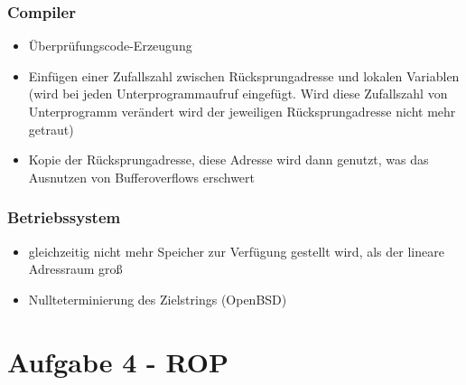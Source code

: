 \documentclass{scrartcl}
\begin{document}
\subsubsection*{Compiler}
  \begin{itemize}
    \item Überprüfungscode-Erzeugung
    \item Einfügen einer Zufallszahl zwischen Rücksprungadresse und lokalen
      Variablen (wird bei jeden Unterprogrammaufruf eingefügt. Wird diese
      Zufallszahl von Unterprogramm verändert wird der jeweiligen
      Rücksprungadresse nicht mehr getraut)
    \item Kopie der Rücksprungadresse, diese Adresse wird dann genutzt, was das
      Ausnutzen von Bufferoverflows erschwert
  \end{itemize}
\subsubsection*{Betriebssystem}
  \begin{itemize}
    \item  gleichzeitig nicht mehr Speicher zur Verfügung gestellt wird, als der
      lineare Adressraum groß
    \item Nullteterminierung des Zielstrings (OpenBSD)
  \end{itemize}


\section*{Aufgabe 4 - ROP}
\end{document}

